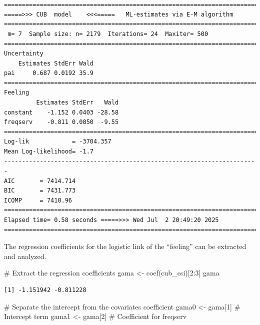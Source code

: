 \documentclass[
  letterpaper,
  DIV=11,
  numbers=noendperiod]{scrartcl}
\newenvironment{Shaded}{\begin{snugshade}}{\end{snugshade}}
\newcommand{\CommentTok}[1]{\textcolor[rgb]{0.37,0.37,0.37}{#1}}
\newcommand{\DecValTok}[1]{\textcolor[rgb]{0.68,0.00,0.00}{#1}}
\newcommand{\FunctionTok}[1]{\textcolor[rgb]{0.28,0.35,0.67}{#1}}
\newcommand{\NormalTok}[1]{\textcolor[rgb]{0.00,0.23,0.31}{#1}}
\newcommand{\OtherTok}[1]{\textcolor[rgb]{0.00,0.23,0.31}{#1}}
\newcommand{\SpecialCharTok}[1]{\textcolor[rgb]{0.37,0.37,0.37}{#1}}
\begin{document}
\begin{verbatim}
======================================================================= 
=====>>> CUB  model    <<<=====   ML-estimates via E-M algorithm   
======================================================================= 
 m= 7  Sample size: n= 2179  Iterations= 24  Maxiter= 500 
======================================================================= 
Uncertainty                                            
    Estimates StdErr Wald
pai     0.687 0.0192 35.9
======================================================================= 
Feeling                                            
         Estimates StdErr   Wald
constant    -1.152 0.0403 -28.58
freqserv    -0.811 0.0850  -9.55
======================================================================= 
Log-lik            = -3704.357 
Mean Log-likelihood= -1.7 
----------------------------------------------------------------------- 
AIC       = 7414.714 
BIC       = 7431.773 
ICOMP     = 7410.96 
======================================================================= 
Elapsed time= 0.58 seconds =====>>> Wed Jul  2 20:49:20 2025 
======================================================================= 
\end{verbatim}

The regression coefficients for the logistic link of the ``feeling'' can
be extracted and analyzed.

\begin{Shaded}
\begin{Highlighting}[]
\CommentTok{\# Extract the regression coefficients}
\NormalTok{gama }\OtherTok{\textless{}{-}} \FunctionTok{coef}\NormalTok{(cub\_csi)[}\DecValTok{2}\SpecialCharTok{:}\DecValTok{3}\NormalTok{]}
\NormalTok{gama}
\end{Highlighting}
\end{Shaded}

\begin{verbatim}
[1] -1.151942 -0.811228
\end{verbatim}

\begin{Shaded}
\begin{Highlighting}[]
\CommentTok{\# Separate the intercept from the covariate\textquotesingle{}s coefficient}
\NormalTok{gama0 }\OtherTok{\textless{}{-}}\NormalTok{ gama[}\DecValTok{1}\NormalTok{] }\CommentTok{\# Intercept term}
\NormalTok{gama1 }\OtherTok{\textless{}{-}}\NormalTok{ gama[}\DecValTok{2}\NormalTok{] }\CommentTok{\# Coefficient for freqserv}
\end{Highlighting}
\end{Shaded}
\end{document}
